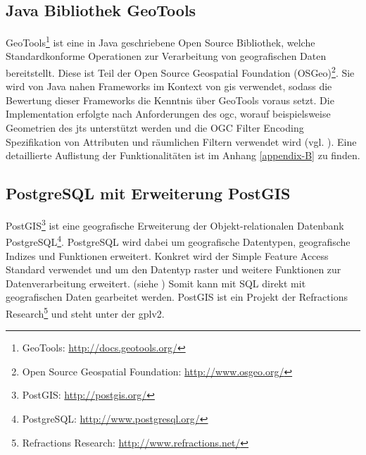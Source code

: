 \subsection{Java Bibliothek GeoTools}
\label{geotools}
GeoTools\footnote{GeoTools: \url{http://docs.geotools.org/}} ist eine in Java geschriebene Open Source Bibliothek, welche Standardkonforme Operationen zur Verarbeitung von geografischen Daten bereitstellt.
Diese ist Teil der Open Source Geospatial Foundation (OSGeo)\footnote{Open Source Geospatial Foundation: \url{http://www.osgeo.org/}}.
Sie wird von Java nahen Frameworks im Kontext von \Gls{gis} verwendet, sodass die Bewertung dieser Frameworks die Kenntnis über GeoTools voraus setzt.
Die Implementation erfolgte nach Anforderungen des \Gls{ogc}, worauf beispielsweise Geometrien des \Gls{jts} unterstützt werden und die OGC Filter Encoding Spezifikation von Attributen und räumlichen Filtern verwendet wird (vgl. \cite{website:geotools}).
Eine detaillierte Auflistung der Funktionalitäten ist im Anhang \ref{appendix-B} zu finden.

\subsection{PostgreSQL mit Erweiterung PostGIS}
PostGIS\footnote{PostGIS: \url{http://postgis.org/}} ist eine geografische Erweiterung der Objekt-relationalen Datenbank PostgreSQL\footnote{PostgreSQL: \url{http://www.postgresql.org/}}.
PostgreSQL wird dabei um geografische Datentypen, geografische Indizes und Funktionen erweitert.
Konkret wird der Simple Feature Access Standard verwendet und um den Datentyp raster und weitere Funktionen zur Datenverarbeitung erweitert. (siehe \cite{website:postgisdocu-opengis})
Somit kann mit SQL direkt mit geografischen Daten gearbeitet werden.
PostGIS ist ein Projekt der Refractions Research\footnote{Refractions Research: \url{http://www.refractions.net/}} und steht unter der \Gls{gpl}v2.


